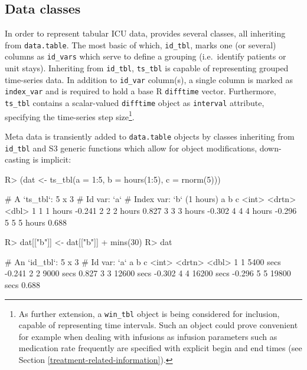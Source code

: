 \documentclass[
]{jss}
\begin{document}
\hypertarget{data-classes}{%
\subsection{Data classes}\label{data-classes}}

In order to represent tabular ICU data,  provides several
classes, all inheriting from \texttt{data.table}. The most basic of
which, \texttt{id\_tbl}, marks one (or several) columns as
\texttt{id\_vars} which serve to define a grouping (i.e.~identify
patients or unit stays). Inheriting from \texttt{id\_tbl},
\texttt{ts\_tbl} is capable of representing grouped time-series data. In
addition to \texttt{id\_var} column(s), a single column is marked as
\texttt{index\_var} and is required to hold a base R \texttt{difftime}
vector. Furthermore, \texttt{ts\_tbl} contains a scalar-valued
\texttt{difftime} object as \texttt{interval} attribute, specifying the
time-series step size\footnote{As further extension, a \texttt{win\_tbl}
  object is being considered for inclusion, capable of representing time
  intervals. Such an object could prove convenient for example when
  dealing with infusions as infusion parameters such as medication rate
  frequently are specified with explicit begin and end times (see
  Section \ref{treatment-related-information}).}.

Meta data is transiently added to \texttt{data.table} objects by classes
inheriting from \texttt{id\_tbl} and S3 generic functions which allow
for object modifications, down-casting is implicit:

\begin{CodeChunk}
\begin{CodeInput}
R> (dat <- ts_tbl(a = 1:5, b = hours(1:5), c = rnorm(5)))
\end{CodeInput}
\begin{CodeOutput}
# A `ts_tbl`: 5 x 3
# Id var:     `a`
# Index var:  `b` (1 hours)
      a b            c
  <int> <drtn>   <dbl>
1     1 1 hours -0.241
2     2 2 hours  0.827
3     3 3 hours -0.302
4     4 4 hours -0.296
5     5 5 hours  0.688
\end{CodeOutput}
\begin{CodeInput}
R> dat[["b"]] <- dat[["b"]] + mins(30)
R> dat
\end{CodeInput}
\begin{CodeOutput}
# An `id_tbl`: 5 x 3
# Id var:      `a`
      a b               c
  <int> <drtn>      <dbl>
1     1  5400 secs -0.241
2     2  9000 secs  0.827
3     3 12600 secs -0.302
4     4 16200 secs -0.296
5     5 19800 secs  0.688
\end{CodeOutput}
\end{CodeChunk}
\end{document}

